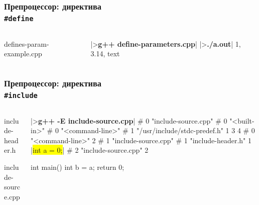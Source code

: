 \documentclass[compress]{beamer}
\newcommand{\shellprompt}{>}
\newcommand{\shellcommand}[1]{\shellprompt \space \textbf{#1}}
\begin{document}
\begin{frame}[fragile]

    \frametitle{Препроцессор: директива \\ \texttt{\#define}}

    \begin{columns}[T]

        \begin{column}{0.5\textwidth}

                {defines-param-example.cpp}

        \end{column}

        \begin{column}{0.5\textwidth}

            \begin{ConsoleWindow}[\scriptsize]
|\shellcommand{g++ define-parameters.cpp}|
|\shellcommand{./a.out}|
1, 3.14, text
            \end{ConsoleWindow}

        \end{column}

    \end{columns}

\end{frame}

\begin{frame}[fragile]

    \frametitle{Препроцессор: директива \\ \texttt{\#include}}

    \begin{columns}[T]

        \begin{column}{0.5\textwidth}

                {include-header.h}

                {include-source.cpp}

        \end{column}

        \begin{column}{0.5\textwidth}

            \begin{ConsoleWindow}
|\shellcommand{g++ -E include-source.cpp}|
# 0 "include-source.cpp"
# 0 "<built-in>"
# 0 "<command-line>"
# 1 "/usr/include/stdc-predef.h" 1 3 4
# 0 "<command-line>" 2
# 1 "include-source.cpp"
# 1 "include-header.h" 1
|\colorbox{yellow}{int a = 0;}|
# 2 "include-source.cpp" 2

int main() {
    int b = a;
    return 0;
}
            \end{ConsoleWindow}

        \end{column}

    \end{columns}

\end{frame}
\end{document}
